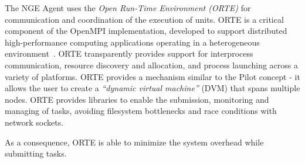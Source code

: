


The NGE Agent uses the \emph{Open Run-Time Environment (ORTE)} for communication
and coordination of the execution of units. ORTE is a critical component of the
OpenMPI implementation, developed to support distributed high-performance
computing applications operating in a heterogeneous environment~\cite{castain05:_open_rte, cug-2016}.  
 ORTE transparently provides support for interprocess communication, resource discovery and allocation, and process launching across a variety of platforms. ORTE provides a mechanism similar to the Pilot concept -
it allows the user to create a \emph{``dynamic virtual machine''} (DVM) that
spans multiple nodes. ORTE provides libraries to enable the submission,
monitoring and managing of tasks, avoiding filesystem bottlenecks and race
conditions with network sockets. 


As a consequence, ORTE is able to minimize the
system overhead while submitting tasks.

%


